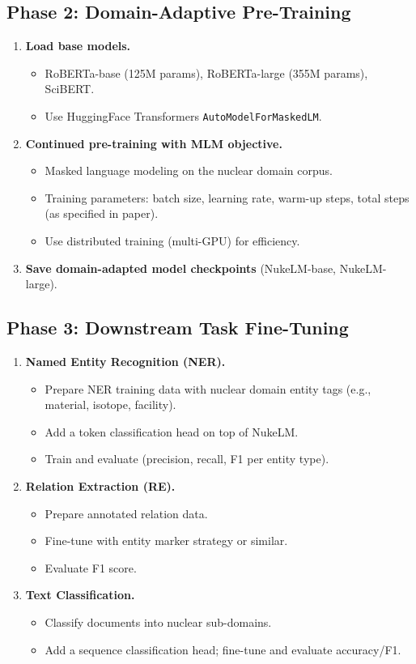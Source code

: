 \documentclass[11pt,a4paper]{article}
\begin{document}
\subsection{Phase 2: Domain-Adaptive Pre-Training}
\begin{enumerate}[label=\textbf{2.\arabic*}]
  \item \textbf{Load base models.}
    \begin{itemize}
      \item RoBERTa-base (125M params), RoBERTa-large (355M params), SciBERT.
      \item Use HuggingFace Transformers \texttt{AutoModelForMaskedLM}.
    \end{itemize}
  \item \textbf{Continued pre-training with MLM objective.}
    \begin{itemize}
      \item Masked language modeling on the nuclear domain corpus.
      \item Training parameters: batch size, learning rate, warm-up steps, total steps (as specified in paper).
      \item Use distributed training (multi-GPU) for efficiency.
    \end{itemize}
  \item \textbf{Save domain-adapted model checkpoints} (NukeLM-base, NukeLM-large).
\end{enumerate}

\subsection{Phase 3: Downstream Task Fine-Tuning}
\begin{enumerate}[label=\textbf{3.\arabic*}]
  \item \textbf{Named Entity Recognition (NER).}
    \begin{itemize}
      \item Prepare NER training data with nuclear domain entity tags (e.g., material, isotope, facility).
      \item Add a token classification head on top of NukeLM.
      \item Train and evaluate (precision, recall, F1 per entity type).
    \end{itemize}
  \item \textbf{Relation Extraction (RE).}
    \begin{itemize}
      \item Prepare annotated relation data.
      \item Fine-tune with entity marker strategy or similar.
      \item Evaluate F1 score.
    \end{itemize}
  \item \textbf{Text Classification.}
    \begin{itemize}
      \item Classify documents into nuclear sub-domains.
      \item Add a sequence classification head; fine-tune and evaluate accuracy/F1.
    \end{itemize}
\end{enumerate}
\end{document}
